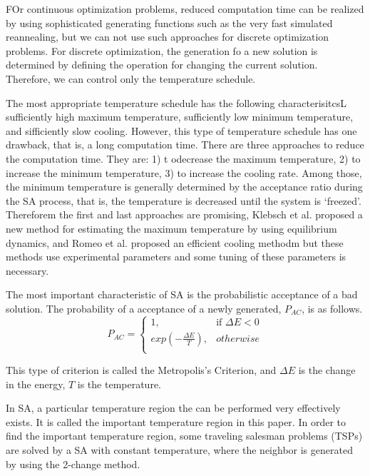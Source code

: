 \documentclass[pdftex,11pt]{article}
\begin{document}
FOr continuous optimization problems, reduced computation time can be realized by using sophisticated generating functions such as the very fast simulated reannealing, but we can not use such approaches for discrete optimization problems. For discrete optimization, the generation fo a new solution is determined by defining the operation for changing the current solution. Therefore, we can control only the temperature schedule.

The most appropriate temperature schedule has the following characterisitcsL sufficiently high maximum temperature, sufficiently low minimum temperature, and sifficiently slow cooling. However, this type of temperature schedule has one drawback, that is, a long computation time. There are three approaches to reduce the computation time. They are: 1) t odecrease the maximum temperature, 2) to increase the minimum temperature, 3) to increase the cooling rate. Among those, the minimum temperature is generally determined by the acceptance ratio during the SA process, that is, the temperature is decreased until the system is `freezed'. Thereforem the first and last approaches are promising, Klebsch et al. proposed a new method for estimating the maximum temperature by using equilibrium dynamics, and Romeo et al. proposed an efficient cooling methodm but these methods use experimental parameters and some tuning of these parameters is necessary.

The most important characteristic of SA is the probabilistic acceptance of a bad solution. The probability of a acceptance of a newly generated, $P_{AC}$, is as follows.
\begin{equation}
	P_{AC} = 
	\begin{cases}
		1, &\text{if $\Delta E < 0$}\\
		exp(-\frac{\Delta E}{T}), &otherwise\\
	\end{cases}
\end{equation}

This type of criterion is called the Metropolis's Criterion, and $\Delta E$ is the change in the energy, $T$ is the temperature.

In SA, a particular temperature region the can be performed very effectively exists. It is called the important temperature region in this paper. In order to find the important temperature region, some traveling salesman problems (TSPs) are solved by a SA with constant temperature, where the neighbor is generated by using the 2-change method.
\end{document}

